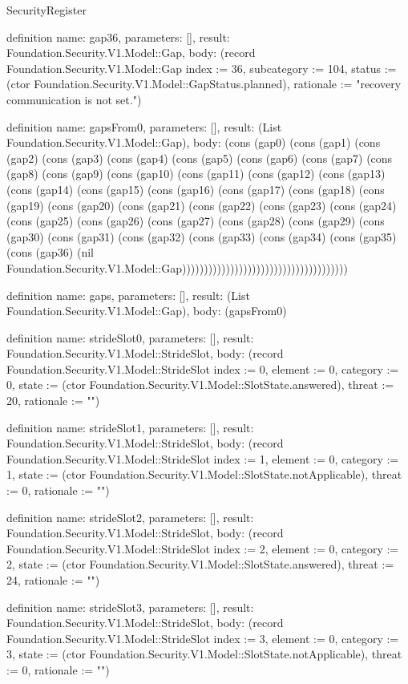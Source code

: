 \begin{lexlean}{SecurityRegister}
\begin{semanticmodule}
definition{
  name: gap36,
  parameters: [],
  result: Foundation.Security.V1.Model::Gap,
  body: (record Foundation.Security.V1.Model::Gap {index := 36, subcategory := 104, status := (ctor Foundation.Security.V1.Model::GapStatus.planned), rationale := "recovery communication is not set."})
}

definition{
  name: gapsFrom0,
  parameters: [],
  result: (List Foundation.Security.V1.Model::Gap),
  body: (cons (gap0) (cons (gap1) (cons (gap2) (cons (gap3) (cons (gap4) (cons (gap5) (cons (gap6) (cons (gap7) (cons (gap8) (cons (gap9) (cons (gap10) (cons (gap11) (cons (gap12) (cons (gap13) (cons (gap14) (cons (gap15) (cons (gap16) (cons (gap17) (cons (gap18) (cons (gap19) (cons (gap20) (cons (gap21) (cons (gap22) (cons (gap23) (cons (gap24) (cons (gap25) (cons (gap26) (cons (gap27) (cons (gap28) (cons (gap29) (cons (gap30) (cons (gap31) (cons (gap32) (cons (gap33) (cons (gap34) (cons (gap35) (cons (gap36) (nil Foundation.Security.V1.Model::Gap))))))))))))))))))))))))))))))))))))))
}

definition{
  name: gaps,
  parameters: [],
  result: (List Foundation.Security.V1.Model::Gap),
  body: (gapsFrom0)
}

definition{
  name: strideSlot0,
  parameters: [],
  result: Foundation.Security.V1.Model::StrideSlot,
  body: (record Foundation.Security.V1.Model::StrideSlot {index := 0, element := 0, category := 0, state := (ctor Foundation.Security.V1.Model::SlotState.answered), threat := 20, rationale := ""})
}

definition{
  name: strideSlot1,
  parameters: [],
  result: Foundation.Security.V1.Model::StrideSlot,
  body: (record Foundation.Security.V1.Model::StrideSlot {index := 1, element := 0, category := 1, state := (ctor Foundation.Security.V1.Model::SlotState.notApplicable), threat := 0, rationale := ""})
}

definition{
  name: strideSlot2,
  parameters: [],
  result: Foundation.Security.V1.Model::StrideSlot,
  body: (record Foundation.Security.V1.Model::StrideSlot {index := 2, element := 0, category := 2, state := (ctor Foundation.Security.V1.Model::SlotState.answered), threat := 24, rationale := ""})
}

definition{
  name: strideSlot3,
  parameters: [],
  result: Foundation.Security.V1.Model::StrideSlot,
  body: (record Foundation.Security.V1.Model::StrideSlot {index := 3, element := 0, category := 3, state := (ctor Foundation.Security.V1.Model::SlotState.notApplicable), threat := 0, rationale := ""})
}


\end{semanticmodule}
\end{lexlean}
